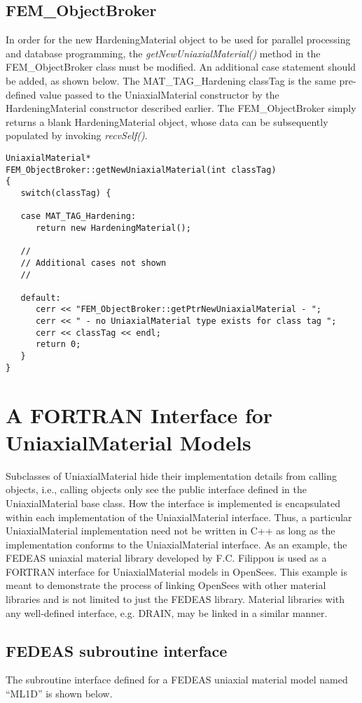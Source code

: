 \documentclass[12pt]{article}
\begin{document}
\subsection{FEM\_ObjectBroker}
In order for the new HardeningMaterial object to be used for parallel processing and
database programming, the {\em getNewUniaxialMaterial()} method in the FEM\_ObjectBroker
class must be modified. An additional case statement should be added, as shown below.
The MAT\_TAG\_Hardening classTag is the same pre-defined value passed to the
UniaxialMaterial constructor by the HardeningMaterial constructor described earlier.
The FEM\_ObjectBroker simply returns a blank HardeningMaterial object, whose data
can be subsequently populated by invoking {\em recvSelf()}.

{\sf\small
\begin{verbatim}
UniaxialMaterial*
FEM_ObjectBroker::getNewUniaxialMaterial(int classTag)
{
   switch(classTag) {

   case MAT_TAG_Hardening:
      return new HardeningMaterial();

   //
   // Additional cases not shown
   //

   default:
      cerr << "FEM_ObjectBroker::getPtrNewUniaxialMaterial - ";
      cerr << " - no UniaxialMaterial type exists for class tag ";
      cerr << classTag << endl;
      return 0;
   }        
}
\end{verbatim}
}

\section{A FORTRAN Interface for UniaxialMaterial Models}
Subclasses of UniaxialMaterial hide their implementation details from calling
objects, i.e., calling objects only see the public interface defined in the UniaxialMaterial
base class. How the interface is implemented is encapsulated within each implementation
of the UniaxialMaterial interface. Thus, a particular UniaxialMaterial implementation
need not be written in C++ as long as the implementation conforms to the UniaxialMaterial
interface.
As an example, the FEDEAS uniaxial material library developed by F.C. Filippou
is used as a FORTRAN interface for
UniaxialMaterial models in OpenSees. This example is meant to demonstrate the process
of linking OpenSees with other material libraries and is not limited to just the
FEDEAS library. Material libraries with any well-defined interface, e.g. DRAIN, may
be linked in a similar manner.

\subsection{FEDEAS subroutine interface}
The subroutine interface defined for a FEDEAS uniaxial material model named ``ML1D''
is shown below.
\end{document}
